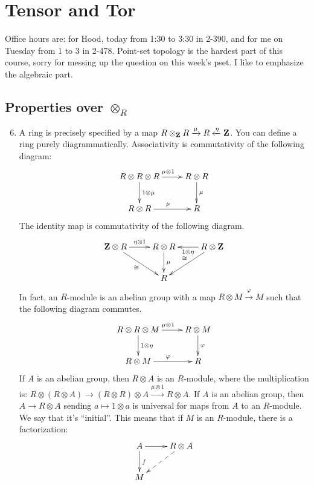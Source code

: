 \section{Tensor and Tor}
Office hours are: for Hood, today from 1:30 to 3:30 in 2-390, and for me on Tuesday from 1 to 3 in 2-478. Point-set topology is the hardest part of this course, sorry for messing up the question on this week's pset. I like to emphasize the algebraic part.
\subsection{Properties over $\otimes_R$}
\begin{enumerate}
\setcounter{enumi}{5}
\item A ring is precisely specified by a map $R\otimes_\mathbf Z R\xrightarrow{\mu}R\xleftarrow{\eta}\mathbf Z$. You can define a
ring purely diagrammatically. Associativity is commutativity of the following diagram:
\begin{equation*}
\xymatrix{R\otimes R\otimes R\ar[r]^{\mu\otimes 1}\ar[d]^{1\otimes \mu} & R\otimes R\ar[d]^{\mu}\\
R\otimes R\ar[r]^{\mu} & R}
\end{equation*}
The identity map is commutativity of the following diagram.
\begin{equation*}
\xymatrix{\Z\otimes R\ar[r]^{\eta\otimes 1}\ar[dr]_{\cong} & R\otimes R\ar[d]^{\mu} & R\otimes \Z\ar[l]^{1\otimes\eta}\ar[dl]_{\cong}\\
& R & }
\end{equation*}
In fact, an $R$-module is an abelian group with a map $R\otimes M\xrightarrow{\varphi}M$ such that the following diagram commutes.
\begin{equation*}
\xymatrix{R\otimes R\otimes M\ar[r]^{\mu\otimes 1}\ar[d]^{1\otimes \eta} & R\otimes M\ar[d]^{\varphi}\\
R\otimes M\ar[r]^{\varphi} & R}
\end{equation*}
If $A$ is an abelian group, then $R\otimes A$ is an $R$-module, where the multiplication is: $R\otimes(R\otimes A)\to (R\otimes R)\otimes A\xrightarrow{\mu\otimes 1}R\otimes A$. If $A$ is an abelian group, then $A\to R\otimes A$ sending $a\mapsto 1\otimes a$ is universal for maps from $A$ to an $R$-module. We say that it's ``initial''. This means that if $M$ is an $R$-module, there is a factorization:
\begin{equation*}
\xymatrix{A\ar[r]\ar[d]^f & R\otimes A\ar@{-->}[dl]\\
M}
\end{equation*}

\end{enumerate}
